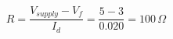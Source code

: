 \documentclass[border=8pt]{standalone}
\begin{document}
$$ R = \frac{V_{supply} - V_f}{I_d} = \frac{5 - 3}{0.020} = 100\,\Omega $$
\end{document}
